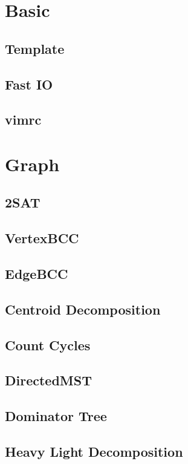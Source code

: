 \section{Basic}
\subsection{Template}

\subsection{Fast IO}

\subsection{vimrc}



\section{Graph}
\subsection{2SAT}

\subsection{VertexBCC}

\subsection{EdgeBCC}

\subsection{Centroid Decomposition}

\subsection{Count Cycles}

\subsection{DirectedMST}

\subsection{Dominator Tree}

\subsection{Heavy Light Decomposition}


